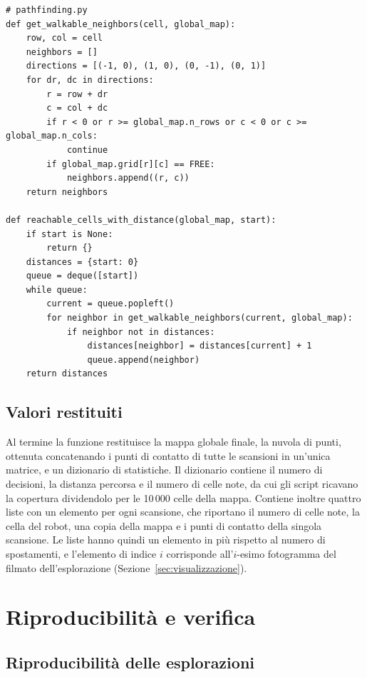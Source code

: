 \begin{lstlisting}[float=!htb, label=lst:ampiezza, caption={Celle confinanti percorribili e ricerca in ampiezza.}]
# pathfinding.py
def get_walkable_neighbors(cell, global_map):
    row, col = cell
    neighbors = []
    directions = [(-1, 0), (1, 0), (0, -1), (0, 1)]
    for dr, dc in directions:
        r = row + dr
        c = col + dc
        if r < 0 or r >= global_map.n_rows or c < 0 or c >= global_map.n_cols:
            continue
        if global_map.grid[r][c] == FREE:
            neighbors.append((r, c))
    return neighbors

def reachable_cells_with_distance(global_map, start):
    if start is None:
        return {}
    distances = {start: 0}
    queue = deque([start])
    while queue:
        current = queue.popleft()
        for neighbor in get_walkable_neighbors(current, global_map):
            if neighbor not in distances:
                distances[neighbor] = distances[current] + 1
                queue.append(neighbor)
    return distances
\end{lstlisting}

\subsection{Valori restituiti}
\label{sec:valori_restituiti}

Al termine la funzione restituisce la mappa globale finale, la nuvola di punti, ottenuta concatenando i punti di contatto di tutte le scansioni in un'unica matrice, e un dizionario di statistiche. Il dizionario contiene il numero di decisioni, la distanza percorsa e il numero di celle note, da cui gli script ricavano la copertura dividendolo per le 10\,000 celle della mappa. Contiene inoltre quattro liste con un elemento per ogni scansione, che riportano il numero di celle note, la cella del robot, una copia della mappa e i punti di contatto della singola scansione. Le liste hanno quindi un elemento in più rispetto al numero di spostamenti, e l'elemento di indice $i$ corrisponde all'$i$-esimo fotogramma del filmato dell'esplorazione (Sezione~\ref{sec:visualizzazione}).

\section{Riproducibilità e verifica}
\label{sec:riproducibilita}

\subsection{Riproducibilità delle esplorazioni}
\label{sec:riproducibilita_esplorazioni}

